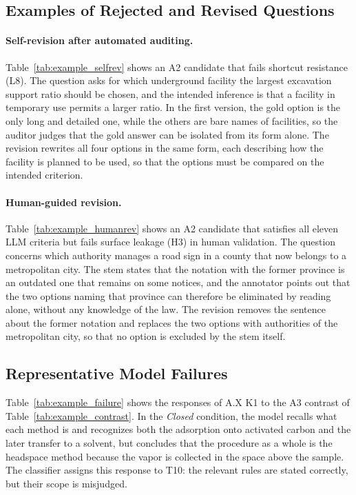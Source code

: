 

\subsection{Examples of Rejected and Revised Questions}

\paragraph{Self-revision after automated auditing.}
Table~\ref{tab:example_selfrev} shows an A2 candidate that fails shortcut resistance (L8).
The question asks for which underground facility the largest excavation support ratio should be chosen, and the intended inference is that a facility in temporary use permits a larger ratio.
In the first version, the gold option is the only long and detailed one, while the others are bare names of facilities, so the auditor judges that the gold answer can be isolated from its form alone.
The revision rewrites all four options in the same form, each describing how the facility is planned to be used, so that the options must be compared on the intended criterion.



\paragraph{Human-guided revision.}
Table~\ref{tab:example_humanrev} shows an A2 candidate that satisfies all eleven LLM criteria but fails surface leakage (H3) in human validation.
The question concerns which authority manages a road sign in a county that now belongs to a metropolitan city.
The stem states that the notation with the former province is an outdated one that remains on some notices, and the annotator points out that the two options naming that province can therefore be eliminated by reading alone, without any knowledge of the law.
The revision removes the sentence about the former notation and replaces the two options with authorities of the metropolitan city, so that no option is excluded by the stem itself.



\subsection{Representative Model Failures}

Table~\ref{tab:example_failure} shows the responses of A.X K1 to the A3 contrast of Table~\ref{tab:example_contrast}.
In the \textit{Closed} condition, the model recalls what each method is and recognizes both the adsorption onto activated carbon and the later transfer to a solvent, but concludes that the procedure as a whole is the headspace method because the vapor is collected in the space above the sample.
The classifier assigns this response to T10: the relevant rules are stated correctly, but their scope is misjudged.

